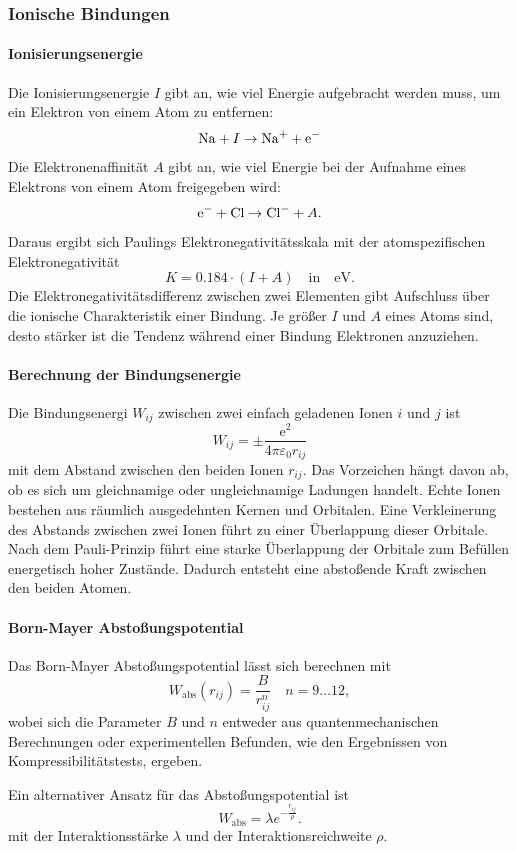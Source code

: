 \subsubsection{Ionische Bindungen}
\paragraph{Ionisierungsenergie}
Die Ionisierungsenergie $I$ gibt an, wie viel Energie aufgebracht werden muss, um ein Elektron von einem Atom zu entfernen:
$$
\ce{Na} + I \to \ce{Na+} +  \ce{e-}
$$ 
Die Elektronenaffinität $A$ gibt an, wie viel Energie bei der Aufnahme eines Elektrons von einem Atom freigegeben wird:
$$
\ce{e-} + \ce{Cl} \to \ce{Cl-}+ A.
$$ 
Daraus ergibt sich Paulings Elektronegativitätsskala mit der atomspezifischen Elektronegativität
$$
K = \num{0,184}\cdot(I+A) \quad \text{in}\quad \si{\electronvolt}.
$$ 
Die Elektronegativitätsdifferenz zwischen zwei Elementen gibt Aufschluss über die ionische Charakteristik einer Bindung.
Je größer $I$ und $A$ eines Atoms sind, desto stärker ist die Tendenz während einer Bindung Elektronen anzuziehen.

\paragraph{Berechnung der Bindungsenergie}
Die Bindungsenergi $W_{ij}$ zwischen zwei einfach geladenen Ionen $i$ und $j$ ist
$$
W_{ij} = \pm \frac{\mathrm{e}^2}{4 \pi \varepsilon_0 r_{ij}}
$$ 
mit dem Abstand zwischen den beiden Ionen $r_{ij}$.
Das Vorzeichen hängt davon ab, ob es sich um gleichnamige oder ungleichnamige Ladungen handelt.
Echte Ionen bestehen aus räumlich ausgedehnten Kernen und Orbitalen. 
Eine Verkleinerung des Abstands zwischen zwei Ionen führt zu einer Überlappung dieser Orbitale.
Nach dem Pauli-Prinzip führt eine starke Überlappung der Orbitale zum Befüllen energetisch hoher Zustände.
Dadurch entsteht eine abstoßende Kraft zwischen den beiden Atomen.

\paragraph{Born-Mayer Abstoßungspotential}
Das Born-Mayer Abstoßungspotential lässt sich berechnen mit
$$
W_{\text{abs}} (r_{ij})= \frac{B}{r_{ij}^{n}}\quad n = 9\ldots 12,
$$ 
wobei sich die Parameter $B$ und $n$ entweder aus quantenmechanischen Berechnungen oder experimentellen Befunden, wie den Ergebnissen von Kompressibilitätstests, ergeben. 

Ein alternativer Ansatz für das Abstoßungspotential ist
$$
W_{\text{abs}} = \lambda e^{ - \frac{r_{ij}}{\rho}}.
$$ 
mit der Interaktionsstärke $ \lambda$ und der Interaktionsreichweite $\rho$. 

